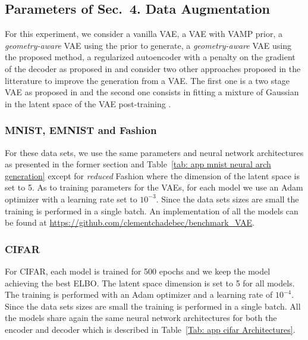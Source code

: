 \documentclass[10pt,journal,compsoc]{IEEEtran}
\begin{document}
\subsection{Parameters of Sec.~4. Data Augmentation}\label{appendix D.2}

For this experiment, we consider a vanilla VAE, a VAE with VAMP prior, a \emph{geometry-aware} VAE using the prior to generate, a \emph{geometry-aware} VAE using the proposed method, a regularized autoencoder with a penalty on the gradient of the decoder as proposed in \cite{ghosh_variational_2020} and consider two other approaches proposed in the litterature to improve the generation from a VAE. The first one is a two stage VAE as proposed in \cite{dai_diagnosing_2018} and the second one consists in fitting a mixture of Gaussian in the latent space of the VAE post-training \cite{ghosh_variational_2020}. 

\subsubsection{MNIST, EMNIST and Fashion}
For these data sets, we use the same parameters and neural network architectures as presented in the former section and Table~\ref{tab: app mnist neural arch generation} except for \textit{reduced} Fashion where the dimension of the latent space is set to 5. As to training parameters for the VAEs, for each model we use an Adam optimizer with a learning rate set to $10^{-3}$. Since the data sets sizes are small the training is performed in a single batch. An implementation of all the models can be found at \url{https://github.com/clementchadebec/benchmark_VAE}.

\subsubsection{CIFAR}
For CIFAR, each model is trained for 500 epochs and we keep the model achieving the best ELBO. The latent space dimension is set to 5 for all models. The training is performed with an Adam optimizer \cite{kingma_adam_2014} and a learning rate of $10^{-4}$. Since the data sets sizes are small the training is performed in a single batch. All the models share again the same neural network architectures for both the encoder and decoder which is described in Table~\ref{Tab: app cifar Architectures}.
\end{document}
